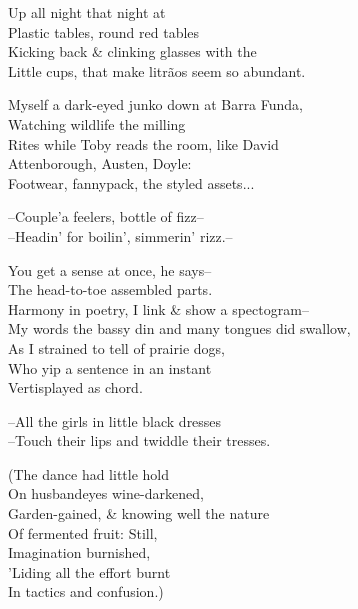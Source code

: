 


Up all night that night at \\
Plastic tables, round red tables \\
Kicking back \& clinking glasses with the \\
Little cups, that make litrãos seem so abundant.

Myself a dark-eyed junko down at Barra Funda, \\
Watching wildlife the milling \\
Rites while Toby reads the room, like David  \\
Attenborough, Austen, Doyle: \\
Footwear, fannypack, the styled assets...

--Couple'a feelers, bottle of fizz-- \\
--Headin' for boilin', simmerin' rizz.--

You get a sense at once, he says-- \\
The head-to-toe assembled parts. \\
Harmony in poetry, I link \& show a spectogram-- \\
My words the bassy din and many tongues did swallow, \\
As I strained to tell of prairie dogs, \\
Who yip a sentence in an instant \\
Vertisplayed as chord.

--All the girls in little black dresses \\
--Touch their lips and twiddle their tresses. 

(The dance had little hold \\
On husbandeyes wine-darkened, \\
Garden-gained, \& knowing well the nature \\
Of fermented fruit: Still, \\
Imagination burnished, \\
'Liding all the effort burnt \\
In tactics and confusion.)

